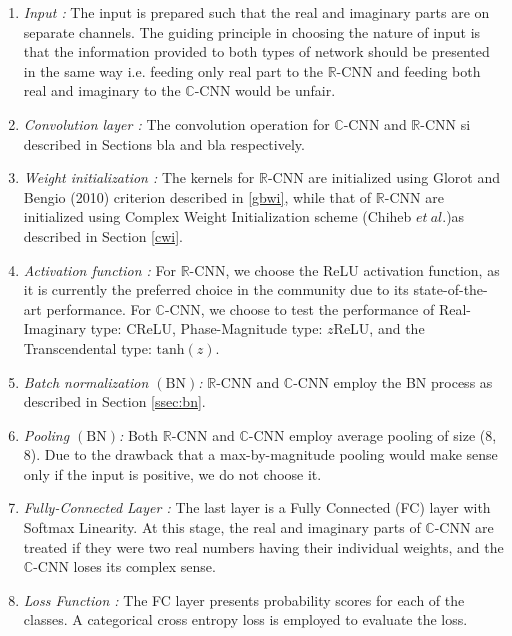  
 \begin{enumerate}
 	\item \textit{Input :} The input is prepared such that the real and imaginary parts are on separate channels. The guiding principle in choosing the nature of input is that the information provided to both types of network should be presented in the same way i.e. feeding only real part to the $\mathbb{R}$-CNN and feeding both real and imaginary to the $\mathbb{C}$-CNN would be unfair. 
 	\item \textit{Convolution layer :} The convolution operation for $\mathbb{C}$-CNN and $\mathbb{R}$-CNN si described in Sections bla and bla respectively.
 	\item \textit{Weight initialization :} The kernels for $\mathbb{R}$-CNN are initialized using Glorot and Bengio (2010) criterion described in \ref{gbwi}, while that of $\mathbb{R}$-CNN are initialized using Complex Weight Initialization scheme (Chiheb $et \ al.$)as described in Section \ref{cwi}.
 	 
 	\item \textit{Activation function :} For $\mathbb{R}$-CNN, we choose the ReLU activation function, as it is currently the preferred choice in the community due to its state-of-the-art performance. For $\mathbb{C}$-CNN, we choose to test the performance of Real-Imaginary type: $\mathrm{C}$ReLU, Phase-Magnitude type: $z$ReLU, and the Transcendental type: $\mathrm{tanh}(z)$.
 	
 	\item \textit{Batch normalization $(\mathrm{BN})$:} $\mathbb{R}$-CNN and $\mathbb{C}$-CNN employ the BN process as described in Section \ref{ssec:bn}.
 	
 	\item \textit{Pooling $(\mathrm{BN})$:} Both $\mathbb{R}$-CNN and $\mathbb{C}$-CNN employ average pooling of size (8,  8). Due to the drawback that a max-by-magnitude pooling would make sense only if the input is positive, we do not choose it. 
 	
 	\item \textit{Fully-Connected Layer :}  The last layer is a Fully Connected (FC) layer with Softmax Linearity. At this stage, the real and imaginary parts of $\mathbb{C}$-CNN are treated if they were two real numbers having their individual weights, and the $\mathbb{C}$-CNN loses its complex sense.
 	
 	\item \textit{Loss Function :} The FC layer presents probability scores for each of the classes. A categorical cross entropy loss is employed to evaluate the loss.
 \end{enumerate}
 
